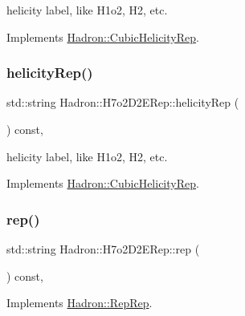 helicity label, like H1o2, H2, etc. 

Implements \mbox{\hyperlink{structHadron_1_1CubicHelicityRep_af1096946b7470edf0a55451cc662f231}{Hadron\+::\+Cubic\+Helicity\+Rep}}.

\mbox{\label{structHadron_1_1H7o2D2ERep_aa655a9ecae0dbff853de4c341c5da210}} 
\subsubsection{\texorpdfstring{helicityRep()}{helicityRep()}\hspace{0.1cm}{\footnotesize\ttfamily [2/2]}}
{\footnotesize\ttfamily std\+::string Hadron\+::\+H7o2\+D2\+E\+Rep\+::helicity\+Rep (\begin{DoxyParamCaption}{ }\end{DoxyParamCaption}) const\hspace{0.3cm}{\ttfamily [inline]}, {\ttfamily [virtual]}}

helicity label, like H1o2, H2, etc. 

Implements \mbox{\hyperlink{structHadron_1_1CubicHelicityRep_af1096946b7470edf0a55451cc662f231}{Hadron\+::\+Cubic\+Helicity\+Rep}}.

\mbox{\label{structHadron_1_1H7o2D2ERep_abd5db7339f3bf5e389260db649418d0d}} 
\subsubsection{\texorpdfstring{rep()}{rep()}\hspace{0.1cm}{\footnotesize\ttfamily [1/3]}}
{\footnotesize\ttfamily std\+::string Hadron\+::\+H7o2\+D2\+E\+Rep\+::rep (\begin{DoxyParamCaption}{ }\end{DoxyParamCaption}) const\hspace{0.3cm}{\ttfamily [inline]}, {\ttfamily [virtual]}}



Implements \mbox{\hyperlink{structHadron_1_1RepRep_ab3213025f6de249f7095892109575fde}{Hadron\+::\+Rep\+Rep}}.

\mbox{\label{structHadron_1_1H7o2D2ERep_abd5db7339f3bf5e389260db649418d0d}} 
